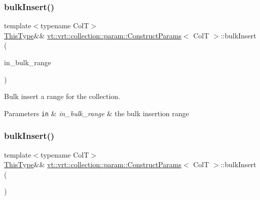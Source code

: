 \subsubsection{\texorpdfstring{bulk\+Insert()}{bulkInsert()}\hspace{0.1cm}{\footnotesize\ttfamily [1/2]}}
{\footnotesize\ttfamily template$<$typename ColT$>$ \\
\hyperlink{structvt_1_1vrt_1_1collection_1_1param_1_1_construct_params_a13d4910c0f6825c7b0ddfebce5288bea}{This\+Type}\&\& \hyperlink{structvt_1_1vrt_1_1collection_1_1param_1_1_construct_params}{vt\+::vrt\+::collection\+::param\+::\+Construct\+Params}$<$ ColT $>$\+::bulk\+Insert (\begin{DoxyParamCaption}\item[{\hyperlink{structvt_1_1vrt_1_1collection_1_1param_1_1_construct_params_a7bc8d5d57e377e0f2e60031582eeb7e6}{Index\+Type}}]{in\+\_\+bulk\+\_\+range }\end{DoxyParamCaption})\hspace{0.3cm}{\ttfamily [inline]}}



Bulk insert a range for the collection. 


\begin{DoxyParams}[1]{Parameters}
\mbox{\tt in}  & {\em in\+\_\+bulk\+\_\+range} & the bulk insertion range \\
\hline
\end{DoxyParams}
\mbox{\label{structvt_1_1vrt_1_1collection_1_1param_1_1_construct_params_abf7e7faa810ea7d6c3a3abf0ad732a01}} 
\subsubsection{\texorpdfstring{bulk\+Insert()}{bulkInsert()}\hspace{0.1cm}{\footnotesize\ttfamily [2/2]}}
{\footnotesize\ttfamily template$<$typename ColT$>$ \\
\hyperlink{structvt_1_1vrt_1_1collection_1_1param_1_1_construct_params_a13d4910c0f6825c7b0ddfebce5288bea}{This\+Type}\&\& \hyperlink{structvt_1_1vrt_1_1collection_1_1param_1_1_construct_params}{vt\+::vrt\+::collection\+::param\+::\+Construct\+Params}$<$ ColT $>$\+::bulk\+Insert (\begin{DoxyParamCaption}{ }\end{DoxyParamCaption})\hspace{0.3cm}{\ttfamily [inline]}}



